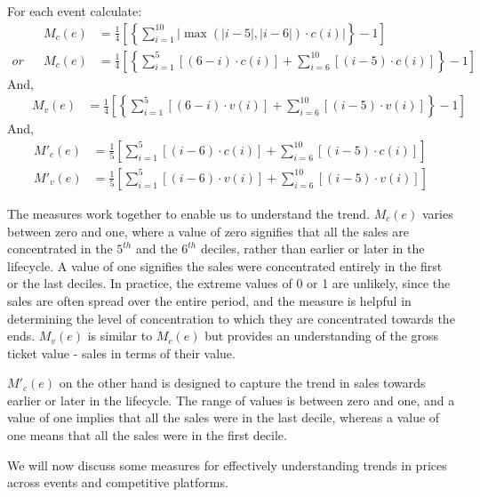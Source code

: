\documentclass[letterpaper, 12pt]{article}
\begin{document}
\noindent For each event calculate:
\begin{align*}
	&&M_c(e) &= \frac{1}{4}\left[\left\{\sum_{i=1}^{10} \left| \max(|i-5|,|i-6|) \cdot c(i) \right|\right\} -1 \right]\\
	or&&M_c(e) &= \frac{1}{4}\left[\left\{\sum_{i=1}^{5} \left[ (6-i) \cdot c(i) \right] +\sum_{i=6}^{10} \left[ (i-5) \cdot c(i) \right]\right\} -1 \right]
\end{align*}
And,
\begin{align*}
	&&M_v(e) &= \frac{1}{4}\left[\left\{\sum_{i=1}^{5} \left[ (6-i) \cdot v(i) \right] +\sum_{i=6}^{10} \left[ (i-5) \cdot v(i) \right]\right\} -1 \right]
\end{align*}
And,
\begin{align*}
	M'_c(e) &= \frac{1}{5}\left[\sum_{i=1}^{5} \left[ (i-6) \cdot c(i) \right] +\sum_{i=6}^{10} \left[ (i-5) \cdot c(i) \right]\right]\\
	M'_v(e) &= \frac{1}{5}\left[\sum_{i=1}^{5} \left[ (i-6) \cdot v(i) \right] +\sum_{i=6}^{10} \left[ (i-5) \cdot v(i) \right]\right]
\end{align*}

The measures work together to enable us to understand the trend. $M_c(e)$ varies between zero and one, where a value of zero signifies that all the sales are concentrated in the $5^{th}$ and the $6^{th}$ deciles, rather than earlier or later in the lifecycle. A value of one signifies the sales were concentrated entirely in the first or the last deciles. In practice, the extreme values of 0 or 1 are unlikely, since the sales are often spread over the entire period, and the measure is helpful in determining the level of concentration to which they are concentrated towards the ends. $M_v(e)$ is similar to $M_c(e)$ but provides an understanding of the gross ticket value - sales in terms of their value.

$M'_c(e)$ on the other hand is designed to capture the trend in sales towards earlier or later in the lifecycle. The range of values is between zero and one, and a value of one implies that all the sales were in the last decile, whereas a value of one means that all the sales were in the first decile. 

We will now discuss some measures for effectively understanding trends in prices across events and competitive platforms. 
\end{document}
